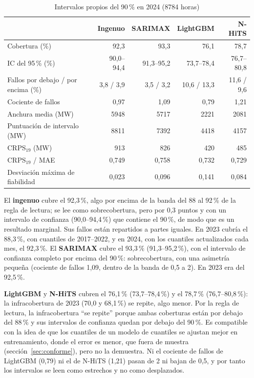 \begin{table}[htbp]
	\centering
	\caption{Intervalos propios del 90\,\% en 2024 (8784 horas)}
	\label{tab:final-propios}
	\small
	\begin{tabular}{lrrrr}
		\hline
		 & \textbf{Ingenuo} & \textbf{SARIMAX} & \textbf{LightGBM} & \textbf{N-HiTS} \\
		\hline
		Cobertura (\%) & 92,3 & 93,3 & 76,1 & 78,7 \\
		\quad IC del 95\,\% (\%) & 90,0--94,4 & 91,3--95,2 & 73,7--78,4 & 76,7--80,8 \\
		Fallos por debajo / por encima (\%) & 3,8 / 3,9 & 3,5 / 3,2 & 10,6 / 13,3 & 11,6 / 9,6 \\
		Cociente de fallos & 0,97 & 1,09 & 0,79 & 1,21 \\
		Anchura media (MW) & 5948 & 5717 & 2221 & 2081 \\
		Puntuación de intervalo (MW) & 8811 & 7392 & 4418 & 4157 \\
		CRPS$_{19}$ (MW) & 913 & 826 & 420 & 485 \\
		CRPS$_{19}$ / MAE & 0,749 & 0,758 & 0,732 & 0,729 \\
		Desviación máxima de fiabilidad & 0,023 & 0,096 & 0,141 & 0,084 \\
		\hline
	\end{tabular}
\end{table}


El \textbf{ingenuo} cubre el 92,3\,\%, algo por encima de la banda del 88 al
92\,\% de la regla de lectura; se lee como sobrecobertura, pero por
0,3 puntos y con un intervalo de confianza (90,0--94,4\,\%) que contiene el
90\,\%, de modo que es un resultado marginal. Sus fallos están repartidos a
partes iguales. En 2023 cubría el 88,3\,\%, con cuantiles de 2017--2022, y en
2024, con los cuantiles actualizados cada mes, el 92,3\,\%. El \textbf{SARIMAX}
cubre el 93,3\,\% (91,3--95,2\,\%), con el intervalo de confianza completo por
encima del 90\,\%: sobrecobertura, con una asimetría pequeña (cociente de
fallos 1,09, dentro de la banda de 0,5 a 2). En 2023 era del 92,5\,\%.

\textbf{LightGBM} y \textbf{N-HiTS} cubren el 76,1\,\% (73,7--78,4\,\%) y el
78,7\,\% (76,7--80,8\,\%): la infracobertura de 2023 (70,0 y 68,1\,\%) se
repite, algo menor. Por la regla de lectura, la infracobertura \enquote{se
repite} porque ambas coberturas están por debajo del 88\,\% y sus intervalos de
confianza quedan por debajo del 90\,\%. Es compatible con la idea de que los cuantiles de un modelo de
cuantiles se ajustan mejor en entrenamiento, donde el error es menor, que
fuera de muestra (sección~\ref{sec:conforme}), pero no la demuestra. Ni el cociente de
fallos de LightGBM (0,79) ni el de N-HiTS (1,21) pasan de 2 ni bajan de 0,5, y
por tanto los intervalos se leen como estrechos y no como desplazados.

